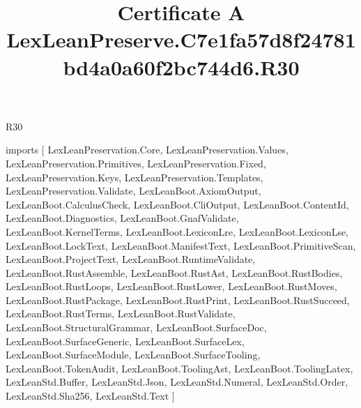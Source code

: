 \begin{lexlean}{R30}
\title{Certificate A LexLeanPreserve.C7e1fa57d8f24781bd4a0a60f2bc744d6.R30}
\begin{coremodule}
imports [
  LexLeanPreservation.Core,
  LexLeanPreservation.Values,
  LexLeanPreservation.Primitives,
  LexLeanPreservation.Fixed,
  LexLeanPreservation.Keys,
  LexLeanPreservation.Templates,
  LexLeanPreservation.Validate,
  LexLeanBoot.AxiomOutput,
  LexLeanBoot.CalculusCheck,
  LexLeanBoot.CliOutput,
  LexLeanBoot.ContentId,
  LexLeanBoot.Diagnostics,
  LexLeanBoot.GnafValidate,
  LexLeanBoot.KernelTerms,
  LexLeanBoot.LexiconLre,
  LexLeanBoot.LexiconLse,
  LexLeanBoot.LockText,
  LexLeanBoot.ManifestText,
  LexLeanBoot.PrimitiveScan,
  LexLeanBoot.ProjectText,
  LexLeanBoot.RuntimeValidate,
  LexLeanBoot.RustAssemble,
  LexLeanBoot.RustAst,
  LexLeanBoot.RustBodies,
  LexLeanBoot.RustLoops,
  LexLeanBoot.RustLower,
  LexLeanBoot.RustMoves,
  LexLeanBoot.RustPackage,
  LexLeanBoot.RustPrint,
  LexLeanBoot.RustSucceed,
  LexLeanBoot.RustTerms,
  LexLeanBoot.RustValidate,
  LexLeanBoot.StructuralGrammar,
  LexLeanBoot.SurfaceDoc,
  LexLeanBoot.SurfaceGeneric,
  LexLeanBoot.SurfaceLex,
  LexLeanBoot.SurfaceModule,
  LexLeanBoot.SurfaceTooling,
  LexLeanBoot.TokenAudit,
  LexLeanBoot.ToolingAst,
  LexLeanBoot.ToolingLatex,
  LexLeanStd.Buffer,
  LexLeanStd.Json,
  LexLeanStd.Numeral,
  LexLeanStd.Order,
  LexLeanStd.Sha256,
  LexLeanStd.Text
]


\end{coremodule}
\end{lexlean}
